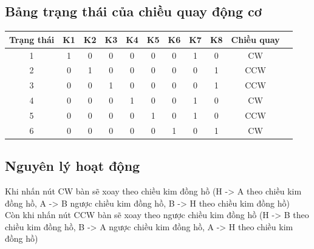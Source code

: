\subsection{Bảng trạng thái của chiều quay động cơ}
\begin{center}
\begin{tabular}{|c|c|c|c|c|c|c|c|c|c|c|}
    \hline  
    Trạng thái & K1 & K2 & K3 & K4 & K5 & K6 & K7 & K8 & Chiều quay\\
    \hline
    1 & 1 & 0 & 0 & 0 & 0 & 0 & 1 & 0 & CW\\
    \hline
    2 & 0 & 1 & 0 & 0 & 0 & 0 & 0 & 1 & CCW\\
    \hline
    3 & 0 & 0 & 1 & 0 & 0 & 0 & 0 & 1 & CCW\\
    \hline
    4 & 0 & 0 & 0 & 1 & 0 & 0 & 1 & 0 & CW\\
    \hline
    5 & 0 & 0 & 0 & 0 & 1 & 0 & 1 & 0 & CCW\\
    \hline
    6 & 0 & 0 & 0 & 0 & 0 & 1 & 0 & 1 & CW\\
    \hline
\end{tabular}
\end{center}
\subsection{Nguyên lý hoạt động}
\hspace*{0.5cm}Khi nhấn nút CW bàn sẽ xoay theo chiều kim đồng hồ (H -> A theo chiều kim đồng hồ, A -> B ngược chiều kim đồng hồ, B -> H theo chiều kim đồng hồ)\\

Còn khi nhấn nút CCW bàn sẽ xoay theo ngược chiều kim đồng hồ (H -> B theo chiều kim đồng hồ, B -> A ngược chiều kim đồng hồ, A -> H theo chiều kim đồng hồ)\\

